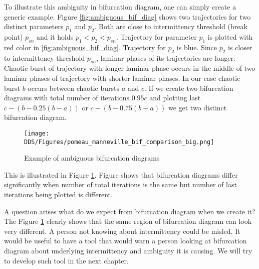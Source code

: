 To illustrate this ambiguity in bifurcation diagram, one can simply create a generic example.
Figure \ref{fig:ambiguous_bif_diag} shows two trajectories for two distinct parameters $p_1$ and $p_2$.
Both are close to intermittency threshold (break point) $p_{sn}$ and it holds $p_1 < p_2 < p_{sn}$.
Trajectory for parameter $p_1$ is plotted with red color in \ref{fig:ambiguous_bif_diag}.
Trajectory for $p_2$ is blue.
Since $p_2$ is closer to intermittency threshold $p_{sn}$, laminar phases of its trajectories are longer.
Chaotic burst of trajectory with longer laminar phase occurs in the middle of two laminar phases of trajectory with shorter laminar phases.
In our case chaotic burst $b$ occurs between chaotic bursts $a$ and $c$.
If we create two bifurcation diagrams with total number of iterations $0.95 c$ and plotting last $c-(b-0.25(b-a))$ or $c-(b-0.75(b-a))$ we get two distinct bifurcation diagram.


\begin{figure}[!h]
    \centering
    \texttt{[image: DDS/Figures/pomeau\_manneville\_bif\_comparison\_big.png]}
    \caption{Example of ambiguous bifurcation diagrams}
    \label{fig:ambiguous_bif_diag_example}
\end{figure}

This is illustrated in Figure \ref{fig:ambiguous_bif_diag_example}.
Figure shows that bifurcation diagrams differ significantly when number of total iterations is the same but number of last iterations being plotted is different.
\par
A question arises what do we expect from bifurcation diagram when we create it?
The Figure \ref{fig:ambiguous_bif_diag_example} clearly shows that the same region of bifurcation diagram can look very different.
A person not knowing about intermittency could be misled.
It would be useful to have a tool that would warn a person looking at bifurcation diagram about underlying intermittency and ambiguity it is causing.
We will try to develop such tool in the next chapter.

